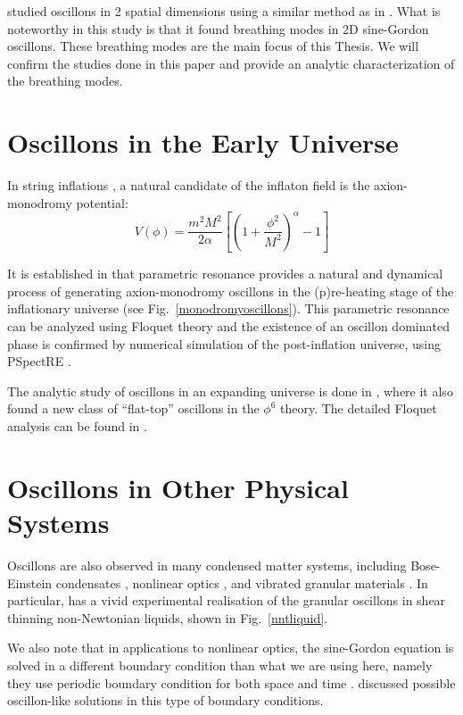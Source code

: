 \documentclass{report}
\begin{document}
\cite{Hindmarsh:2006ur} studied oscillons in 2 spatial dimensions using a similar method as in \cite{Salmi:2012ta}. What is noteworthy in this study is that it found breathing modes in 2D sine-Gordon oscillons. These breathing modes are the main focus of this Thesis. We will confirm the studies done in this paper and provide an analytic characterization of the breathing modes.

\section{Oscillons in the Early Universe}\label{litrev:cosmo}
In string inflations \cite{stringInflationBook, McAllister:2008hb, Silverstein:2008sg, Flauger:2009ab}, a natural candidate of the inflaton field is the axion-monodromy potential:
\begin{equation}
  V(\phi) = \frac{m^2M^2}{2\alpha} \left[\left(1+\frac{\phi^2}{M^2}\right)^\alpha -1\right]
\end{equation}

It is established in \cite{Amin:2010dc, Amin:2011hj} that parametric resonance provides a natural and dynamical process of generating axion-monodromy oscillons in the (p)re-heating stage of the inflationary universe (see Fig.~\ref{monodromyoscillons}). This parametric resonance can be analyzed using Floquet theory and the existence of an oscillon dominated phase is confirmed by numerical simulation of the post-inflation universe, using PSpectRE \cite{Easther:2010qz}.

The analytic study of oscillons in an expanding universe is done in \cite{Amin:2010jq}, where it also found a new class of ``flat-top'' oscillons in the $\phi^6$ theory. The detailed Floquet analysis can be found in \cite{Amin:2010dc}.

\section{Oscillons in Other Physical Systems}\label{litrev:phymisc}
Oscillons are also observed in many condensed matter systems, including Bose-Einstein condensates \cite{umbanhowar1996localized}, nonlinear optics \cite{Copeland:2014qra}, and vibrated granular materials \cite{Tsimring:1997zz, PhysRevLett.83.3190}. In particular, \cite{PhysRevLett.83.3190} has a vivid experimental realisation of the granular oscillons in shear thinning non-Newtonian liquids, shown in Fig.~\ref{nntliquid}.

We also note that in applications to nonlinear optics, the sine-Gordon equation is solved in a different boundary condition than what we are using here, namely they use periodic boundary condition for both space and time \cite{JAWORSKI1982427, 0305-4470-15-10-015}. \cite{JAWORSKI1982427, 0305-4470-15-10-015} discussed possible oscillon-like solutions in this type of boundary conditions.
\end{document}
